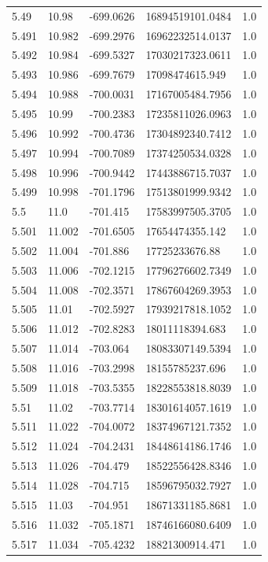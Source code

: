 \begin{tabular}{lllll}
5.49 & 10.98 & -699.0626 & 16894519101.0484 & 1.0 \\
5.491 & 10.982 & -699.2976 & 16962232514.0137 & 1.0 \\
5.492 & 10.984 & -699.5327 & 17030217323.0611 & 1.0 \\
5.493 & 10.986 & -699.7679 & 17098474615.949 & 1.0 \\
5.494 & 10.988 & -700.0031 & 17167005484.7956 & 1.0 \\
5.495 & 10.99 & -700.2383 & 17235811026.0963 & 1.0 \\
5.496 & 10.992 & -700.4736 & 17304892340.7412 & 1.0 \\
5.497 & 10.994 & -700.7089 & 17374250534.0328 & 1.0 \\
5.498 & 10.996 & -700.9442 & 17443886715.7037 & 1.0 \\
5.499 & 10.998 & -701.1796 & 17513801999.9342 & 1.0 \\
5.5 & 11.0 & -701.415 & 17583997505.3705 & 1.0 \\
5.501 & 11.002 & -701.6505 & 17654474355.142 & 1.0 \\
5.502 & 11.004 & -701.886 & 17725233676.88 & 1.0 \\
5.503 & 11.006 & -702.1215 & 17796276602.7349 & 1.0 \\
5.504 & 11.008 & -702.3571 & 17867604269.3953 & 1.0 \\
5.505 & 11.01 & -702.5927 & 17939217818.1052 & 1.0 \\
5.506 & 11.012 & -702.8283 & 18011118394.683 & 1.0 \\
5.507 & 11.014 & -703.064 & 18083307149.5394 & 1.0 \\
5.508 & 11.016 & -703.2998 & 18155785237.696 & 1.0 \\
5.509 & 11.018 & -703.5355 & 18228553818.8039 & 1.0 \\
5.51 & 11.02 & -703.7714 & 18301614057.1619 & 1.0 \\
5.511 & 11.022 & -704.0072 & 18374967121.7352 & 1.0 \\
5.512 & 11.024 & -704.2431 & 18448614186.1746 & 1.0 \\
5.513 & 11.026 & -704.479 & 18522556428.8346 & 1.0 \\
5.514 & 11.028 & -704.715 & 18596795032.7927 & 1.0 \\
5.515 & 11.03 & -704.951 & 18671331185.8681 & 1.0 \\
5.516 & 11.032 & -705.1871 & 18746166080.6409 & 1.0 \\
5.517 & 11.034 & -705.4232 & 18821300914.471 & 1.0 \\

\end{tabular}
